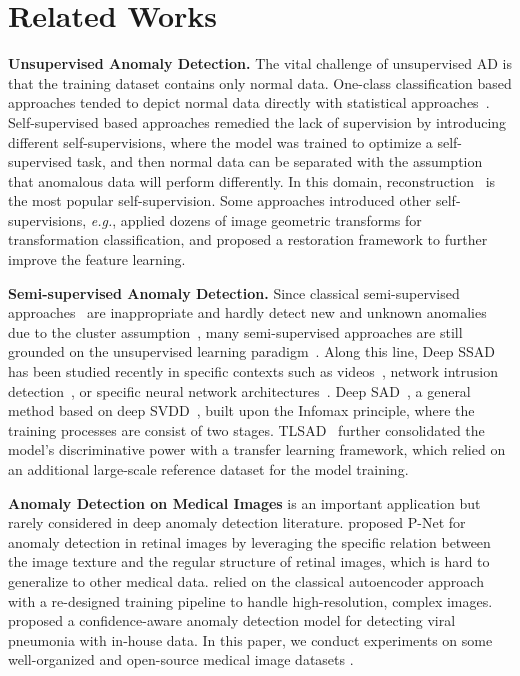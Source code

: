 \documentclass{bmvc2k}
\begin{document}
\vspace{-16pt}
\section{Related Works}
\vspace{-5pt}
\noindent\textbf{Unsupervised Anomaly Detection.}
The vital challenge of unsupervised AD is that the training dataset contains only normal data. One-class classification based approaches tended to depict normal data directly with statistical approaches~\cite{Eskin2000Anomaly,scholkopf2001estimating,Xu2012Robust,Rahmani2017Coherence,ruff2018deep}. Self-supervised based approaches remedied the lack of supervision by introducing different self-supervisions, where the model was trained to optimize a self-supervised task, and then normal data can be separated with the assumption that anomalous data will perform differently. In this domain, reconstruction~\cite{Sakurada2014Anomaly,an2015variational,xia2015learning,nicolau2016hybrid,schlegl2017unsupervised,zong2018deep,deecke2018image,Sabokrou2018Adversarially,Akcay2018,gong2019memorizing} is the most popular self-supervision. Some approaches introduced other self-supervisions, \emph{e.g.}, \cite{golan2018deep} applied dozens of image geometric transforms for transformation classification, and \cite{fye2020ARNet} proposed a restoration framework to further improve the feature learning.

\noindent\textbf{Semi-supervised Anomaly Detection.}
Since classical semi-supervised approaches~\cite{kingma2014semi,rasmus2015semi,odena2016semi,dai2017good,oliver2018realistic} are inappropriate and hardly detect new and unknown anomalies due to the cluster assumption~\cite{chapelle2009semi}, many semi-supervised approaches are still grounded on the unsupervised learning paradigm~\cite{gornitz2013toward}. Along this line, Deep SSAD~\cite{gornitz2013toward} has been studied recently in specific contexts such as videos~\cite{Kiran2018An}, network intrusion detection~\cite{min2018ids}, or specific neural network architectures~\cite{ergen2017unsupervised}. Deep SAD~\cite{SAD}, a general method based on deep SVDD~\cite{ruff2018deep}, built upon the Infomax principle, where the training processes are consist of two stages. TLSAD~\cite{TLSAD} further consolidated the model's discriminative power with a transfer learning framework, which relied on an additional large-scale reference dataset for the model training.

\noindent\textbf{Anomaly Detection on Medical Images} 
is an important application but rarely considered in deep anomaly detection literature. \cite{zhou2020encoding} proposed P-Net for anomaly detection in retinal images by leveraging the specific relation between the image texture and the regular structure of retinal images, which is hard to generalize to other medical data. \cite{tuluptceva2020anomaly} relied on the classical autoencoder approach with a re-designed training pipeline to handle high-resolution, complex images. \cite{zhang2020viral} proposed a confidence-aware anomaly detection model for detecting viral pneumonia with in-house data. In this paper, we conduct experiments on some well-organized and open-source medical image datasets \cite{bejnordi2017diagnostic,wang2017chestx}.
\end{document}
